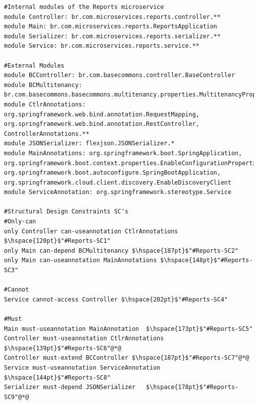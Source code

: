 \documentclass[12pt]{article}
\begin{document}
\begin{lstlisting}[style=colorido,caption={\textcolor{blue}{Reports microservice's architectural design specification.}},label={list:especArquiteturalReports}
]
#Internal modules of the Reports microservice
module Controller: br.com.microservices.reports.controller.**
module Main: br.com.microservices.reports.ReportsApplication
module Serializer: br.com.microservices.reports.serializer.**
module Service: br.com.microservices.reports.service.**

#External Modules
module BCController: br.com.basecommons.controller.BaseController
module BCMultitenancy: br.com.basecommons.basecommons.multitenancy.properties.MultitenancyProperties
module CtlrAnnotations: org.springframework.web.bind.annotation.RequestMapping, org.springframework.web.bind.annotation.RestController, ControllerAnnotations.**
module JSONSerializer: flexjson.JSONSerializer.*
module MainAnnotations: org.springframework.boot.SpringApplication,  org.springframework.boot.context.properties.EnableConfigurationProperties, org.springframework.boot.autoconfigure.SpringBootApplication, org.springframework.cloud.client.discovery.EnableDiscoveryClient
module ServiceAnnotation: org.springframework.stereotype.Service

#Structural Design Constraints SC's
#Only-can
only Controller can-useannotation CtlrAnnotations $\hspace{120pt}$"#Reports-SC1"
only Main can-depend BCMultitenancy $\hspace{187pt}$"#Reports-SC2"
only Main can-useannotation MainAnnotations $\hspace{148pt}$"#Reports-SC3"

#Cannot
Service cannot-access Controller $\hspace{202pt}$"#Reports-SC4"

#Must	
Main must-useannotation MainAnnotation  $\hspace{173pt}$"#Reports-SC5"
Controller must-useannotation CtlrAnnotations $\hspace{139pt}$"#Reports-SC6"@*@
Controller must-extend BCController	$\hspace{187pt}$"#Reports-SC7"@*@
Service must-useannotation ServiceAnnotation $\hspace{144pt}$"#Reports-SC8"
Serializer must-depend JSONSerializer	$\hspace{178pt}$"#Reports-SC9"@*@

\end{lstlisting}
\end{document}
